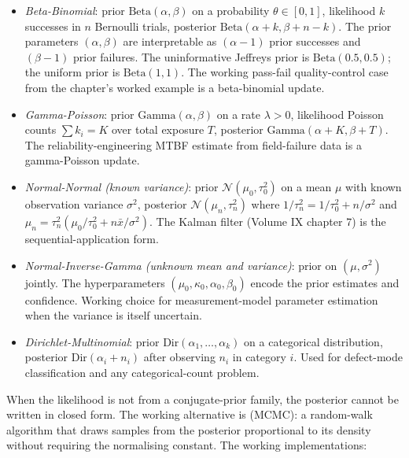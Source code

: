 \begin{itemize}[leftmargin=*]
  \item \textit{Beta-Binomial}: prior $\text{Beta}(\alpha, \beta)$
    on a probability $\theta \in [0, 1]$, likelihood $k$ successes
    in $n$ Bernoulli trials, posterior $\text{Beta}(\alpha + k,
    \beta + n - k)$. The prior parameters $(\alpha, \beta)$ are
    interpretable as $(\alpha - 1)$ prior successes and
    $(\beta - 1)$ prior failures. The uninformative Jeffreys prior
    is $\text{Beta}(0.5, 0.5)$; the uniform prior is
    $\text{Beta}(1, 1)$. The working pass-fail quality-control
    case from the chapter's worked example is a beta-binomial
    update.
  \item \textit{Gamma-Poisson}: prior $\text{Gamma}(\alpha, \beta)$
    on a rate $\lambda > 0$, likelihood Poisson counts $\sum k_{i}
    = K$ over total exposure $T$, posterior $\text{Gamma}(\alpha +
    K, \beta + T)$. The reliability-engineering MTBF estimate from
    field-failure data is a gamma-Poisson update.
  \item \textit{Normal-Normal (known variance)}: prior $\mathcal{N}
    (\mu_{0}, \tau_{0}^{2})$ on a mean $\mu$ with known
    observation variance $\sigma^{2}$, posterior $\mathcal{N}
    (\mu_{n}, \tau_{n}^{2})$ where $1/\tau_{n}^{2} = 1/\tau_{0}^{2}
    + n/\sigma^{2}$ and $\mu_{n} = \tau_{n}^{2} (\mu_{0}/\tau_{0}^{2}
    + n\bar{x}/\sigma^{2})$. The Kalman filter (Volume IX
    chapter 7) is the sequential-application form.
  \item \textit{Normal-Inverse-Gamma (unknown mean and variance)}:
    prior on $(\mu, \sigma^{2})$ jointly. The hyperparameters
    $(\mu_{0}, \kappa_{0}, \alpha_{0}, \beta_{0})$ encode the
    prior estimates and confidence. Working choice for
    measurement-model parameter estimation when the variance is
    itself uncertain.
  \item \textit{Dirichlet-Multinomial}: prior $\text{Dir}
    (\alpha_{1}, \ldots, \alpha_{k})$ on a categorical
    distribution, posterior $\text{Dir}(\alpha_{i} + n_{i})$ after
    observing $n_{i}$ in category $i$. Used for defect-mode
    classification and any categorical-count problem.
\end{itemize}

When the likelihood is not from a conjugate-prior family, the
posterior cannot be written in closed form. The working
alternative is  (MCMC): a
random-walk algorithm that draws samples from the posterior
proportional to its density without requiring the normalising
constant. The working implementations:

